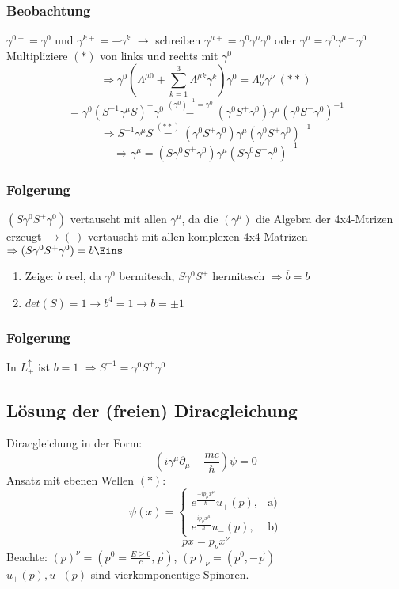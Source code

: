\documentclass[twoside,a4paper]{scrartcl}
\renewcommand{\1}{\mathds{1}}
\newcommand{\Ra}{\Rightarrow}
\newcommand{\ra}{\rightarrow}
\renewcommand{\L}{\Lambda}
\begin{document}
\subsubsection*{Beobachtung}
$\gamma^{0+}=\gamma^0$ und $\gamma^{k+}=-\gamma^k$ $\ra$ schreiben $\gamma^{\mu+}=\gamma^0\gamma^\mu\gamma^0$ oder $\gamma^{\mu}=\gamma^0\gamma^{\mu+}\gamma^0$ \\
Multipliziere $(*)$ von links und rechts mit $\gamma^0$\\
$$\Ra \gamma^0(\L^{\mu0}+\sum_{k=1}^3 \L^{\mu k} \gamma^k)\gamma^0=\L_\nu^\mu \gamma^\nu \ (**)$$
$$=\gamma^0(S^{-1} \gamma^\mu S)^+\gamma^0\stackrel{(\gamma^0)^{-1}=\gamma^0}{=} (\gamma^0 S^+\gamma^0)\gamma^\mu(\gamma^0 S^+ \gamma^0)^{-1}$$
$$\Ra S^{-1}\gamma^{\mu} S \stackrel{(**)}{=} (\gamma^0S^+\gamma^0)\gamma^\mu(\gamma^0 S^+ \gamma^0)^{-1}$$
$$\Ra \gamma^\mu=(S\gamma^0S^+\gamma^0) \gamma^\mu (S \gamma^0 S^+ \gamma^0)^{-1}$$ 
\subsubsection*{Folgerung}
$(S\gamma^0 S^+ \gamma^0)$ vertauscht mit allen $\gamma^\mu$, da die $(\gamma^\mu)$ die Algebra der 4x4-Mtrizen erzeugt $\ra (\ )$ vertauscht mit allen komplexen 4x4-Matrizen $\Ra (S \gamma^0 S^+ \gamma^0)=b \Eins$
\begin{enumerate}
\item Zeige: $b$ reel, da $\gamma^0$ bermitesch, $S\gamma^0 S^{+}$ hermitesch $\Ra \overline{b}=b$
\item $det(S)=1 \ra b^4=1 \ra b=\pm 1$
\end{enumerate}
\subsubsection*{Folgerung}
In $L_+^\uparrow$ ist $b=1$ $\Ra S^{-1}=\gamma^0 S^+ \gamma^0$

% 
\subsection{Lösung der (freien) Diracgleichung}
Diracgleichung in der Form:
$$(i\gamma^\mu \partial_\mu-\frac{mc}{\hbar})\psi=0$$
Ansatz mit ebenen Wellen $(*)$:
$$\psi(x)=\begin{cases}
  e^{\frac{-ip_\mu x^\mu}{\hbar}}u_+(p),  & \text{a)}\\
  e^{\frac{ip_\mu x^\mu}{\hbar}}u_-(p), & \text{b)}
\end{cases}$$
$$px=p_\nu x^\nu$$
Beachte: $(p)^\nu=(p^0=\frac{E\geq 0}{c}, \vec p)$, $(p)_\nu=(p^0,-\vec p)$\\
$u_+(p), u_-(p)$ sind vierkomponentige Spinoren.
\end{document}

